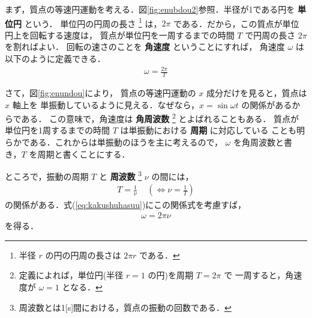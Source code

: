                         まず，質点の等速円運動を考える．図\ref{fig:enubdou2}参照．半径が1である円を \textbf{単位円} という．
                        単位円の円周の長さ
                                    \footnote{
                                    半径 $r$ の円の円周の長さは $2\pi r$ である．
                                    }
                        は，$2\pi$ である．だから，この質点が単位円上を回転する速度は，
                        質点が単位円を一周するまでの時間 $T$ で円周の長さ $2\pi$ を割ればよい．
                        回転の速さのことを \textbf{角速度} ということにすれば，
                        角速度 $\omega$ は以下のように定義できる．
                            \begin{align}\label{eq:kakushuhasuu}
                                \omega=\frac{2\pi}{T}
                            \end{align}

                        さて，図\ref{fig:enundou}により，
                        質点の等速円運動の $x$ 成分だけを見ると，質点は $x$ 軸上を
                        単振動しているように見える．なぜなら，$x=\sin\omega t$ の関係があるからである．
                        この意味で，角速度は \textbf{角周波数}
                                    \footnote{
                                    定義によれば，単位円(半径 $r=1$ の円)を周期 $T=2\pi$ で
                                    一周すると，角速度が $\omega =1$ となる．
                                    }
                        とよばれることもある．
                        質点が単位円を1周するまでの時間 $T$ は単振動における \textbf{周期} に対応している
                        ことも明らかである．これからは単振動のほうを主に考えるので，
                        $\omega$ を角周波数と書き，$T$ を周期と書くことにする．


                        ところで，振動の周期 $T$ と \textbf{周波数}
                        \footnote{
                        周波数とは1[s]間における，質点の振動の回数である．
                        }
                        $\nu$ の間には，
                            \begin{align}
                                T=\frac{1}{\nu}\, \quad\left(\Leftrightarrow  \nu=\frac{1}{T} \right)
                            \end{align}
                        の関係がある．式(\ref{eq:kakushuhasuu})にこの関係式を考慮すば，
                            \begin{align}
                                \omega=2\pi\nu
                            \end{align}
                        を得る．

